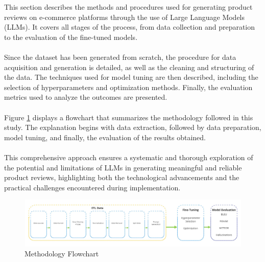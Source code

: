 This section describes the methods and procedures used for generating product reviews on e-commerce platforms through the use of Large Language Models (LLMs). It covers all stages of the process, from data collection and preparation to the evaluation of the fine-tuned models.
\\\\
Since the dataset has been generated from scratch, the procedure for data acquisition and generation is detailed, as well as the cleaning and structuring of the data. The techniques used for model tuning are then described, including the selection of hyperparameters and optimization methods. Finally, the evaluation metrics used to analyze the outcomes are presented.
\\\\
Figure \ref{fig:MethodologyFlowchart} displays a flowchart that summarizes the methodology followed in this study. The explanation begins with data extraction, followed by data preparation, model tuning, and finally, the evaluation of the results obtained.
\\\\
This comprehensive approach ensures a systematic and thorough exploration of the potential and limitations of LLMs in generating meaningful and reliable product reviews, highlighting both the technological advancements and the practical challenges encountered during implementation.

\begin{figure}[H]
    \centering
    \includegraphics[width=12cm]{images/Methodology.jpg}
    \caption{Methodology Flowchart}
    \label{fig:MethodologyFlowchart}
\end{figure}
